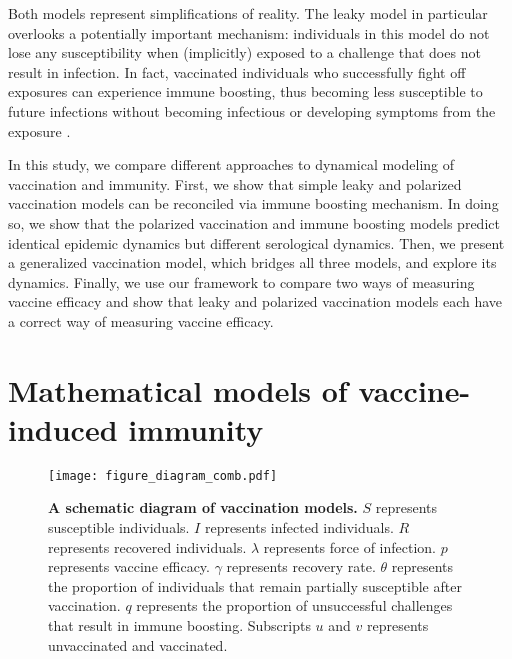 \documentclass[12pt]{article}
\begin{document}
Both models represent simplifications of reality.
The leaky model in particular overlooks a potentially important mechanism: individuals in this model do not lose any susceptibility when (implicitly) exposed to a challenge that does not result in infection. 
In fact, vaccinated individuals who successfully fight off exposures can experience immune boosting, thus becoming less susceptible to future infections without becoming infectious or developing symptoms from the exposure \citep{lavine2011natural,yang2020waning}.

In this study, we compare different approaches to dynamical modeling of vaccination and immunity.
First, we show that simple leaky and polarized vaccination models can be reconciled via immune boosting mechanism.
In doing so, we show that the polarized vaccination and immune boosting models predict identical epidemic dynamics but different serological dynamics.
Then, we present a generalized vaccination model, which bridges all three models, and explore its dynamics.
Finally, we use our framework to compare two ways of measuring vaccine efficacy and show that leaky and polarized vaccination models each have a correct way of measuring vaccine efficacy.

\section*{Mathematical models of vaccine-induced immunity}

\begin{figure}[!th]
\texttt{[image: figure\_diagram\_comb.pdf]}
\caption{
\textbf{A schematic diagram of vaccination models.}
$S$ represents susceptible individuals. $I$ represents infected individuals. $R$ represents recovered individuals.
$\lambda$ represents force of infection. 
$p$ represents vaccine efficacy.
$\gamma$ represents recovery rate.
$\theta$ represents the proportion of individuals that remain partially susceptible after vaccination.
$q$ represents the proportion of unsuccessful challenges that result in immune boosting.
Subscripts $u$ and $v$ represents unvaccinated and vaccinated.
\label{fig:diagram}
}
\end{figure}
\end{document}
